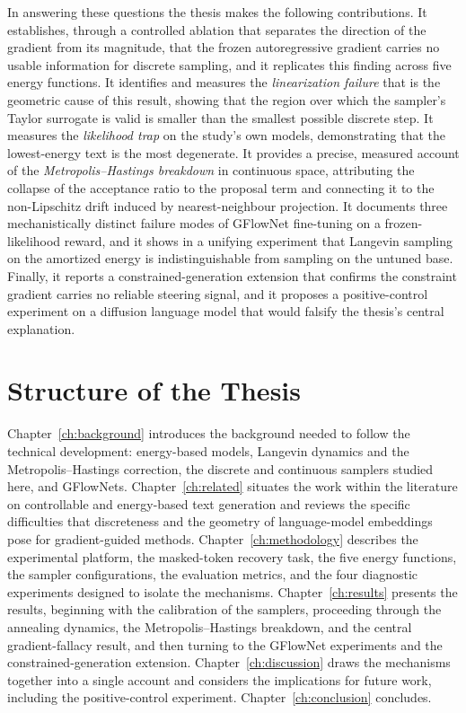 In answering these questions the thesis makes the following contributions. It establishes, through a controlled ablation that separates the direction of the gradient from its magnitude, that the frozen autoregressive gradient carries no usable information for discrete sampling, and it replicates this finding across five energy functions. It identifies and measures the \emph{linearization failure} that is the geometric cause of this result, showing that the region over which the sampler's Taylor surrogate is valid is smaller than the smallest possible discrete step. It measures the \emph{likelihood trap} on the study's own models, demonstrating that the lowest-energy text is the most degenerate. It provides a precise, measured account of the \emph{Metropolis--Hastings breakdown} in continuous space, attributing the collapse of the acceptance ratio to the proposal term and connecting it to the non-Lipschitz drift induced by nearest-neighbour projection. It documents three mechanistically distinct failure modes of GFlowNet fine-tuning on a frozen-likelihood reward, and it shows in a unifying experiment that Langevin sampling on the amortized energy is indistinguishable from sampling on the untuned base. Finally, it reports a constrained-generation extension that confirms the constraint gradient carries no reliable steering signal, and it proposes a positive-control experiment on a diffusion language model that would falsify the thesis's central explanation.

\section{Structure of the Thesis}

Chapter~\ref{ch:background} introduces the background needed to follow the technical development: energy-based models, Langevin dynamics and the Metropolis--Hastings correction, the discrete and continuous samplers studied here, and GFlowNets. Chapter~\ref{ch:related} situates the work within the literature on controllable and energy-based text generation and reviews the specific difficulties that discreteness and the geometry of language-model embeddings pose for gradient-guided methods. Chapter~\ref{ch:methodology} describes the experimental platform, the masked-token recovery task, the five energy functions, the sampler configurations, the evaluation metrics, and the four diagnostic experiments designed to isolate the mechanisms. Chapter~\ref{ch:results} presents the results, beginning with the calibration of the samplers, proceeding through the annealing dynamics, the Metropolis--Hastings breakdown, and the central gradient-fallacy result, and then turning to the GFlowNet experiments and the constrained-generation extension. Chapter~\ref{ch:discussion} draws the mechanisms together into a single account and considers the implications for future work, including the positive-control experiment. Chapter~\ref{ch:conclusion} concludes.
